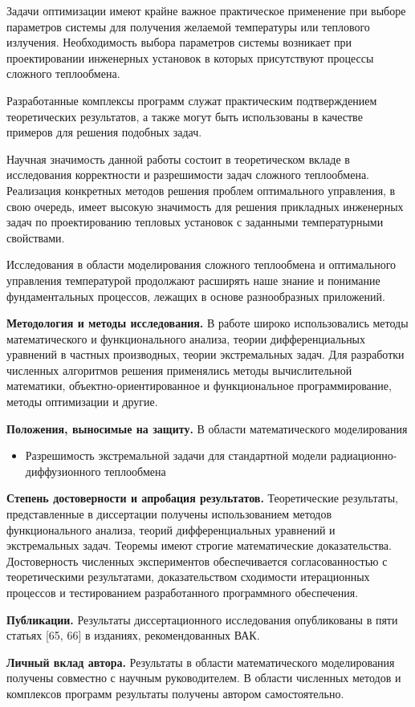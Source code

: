 Задачи оптимизации имеют крайне важное практическое применение при выборе параметров системы для
получения желаемой температуры или теплового излучения.
Необходимость выбора параметров системы возникает при проектировании инженерных установок
в которых присутствуют процессы сложного теплообмена.

Разработанные комплексы программ служат практическим подтверждением теоретических результатов,
а также могут быть использованы в качестве примеров для решения подобных задач.


Научная значимость данной работы состоит в теоретическом вкладе
в исследования корректности и разрешимости задач сложного теплообмена.
Реализация конкретных методов решения проблем оптимального управления,
в свою очередь, имеет высокую
значимость для решения прикладных инженерных задач по проектированию
тепловых установок с заданными температурными свойствами.


Исследования в области моделирования сложного теплообмена и оптимального управления
температурой продолжают расширять наше знание и понимание фундаментальных процессов,
лежащих в основе разнообразных приложений.

\textbf{Методология и методы исследования.}
В работе широко использовались методы математического и
функционального анализа, теории дифференциальных
уравнений в частных производных, теории экстремальных задач.
Для разработки численных алгоритмов решения
применялись методы вычислительной математики,
объектно-ориентированное и функциональное программирование,
методы оптимизации и другие.


\textbf{Положения, выносимые на защиту.}
В области математического моделирования
\begin{itemize}
    \item Разрешимость экстремальной задачи для стандартной модели радиационно-диффузионного теплообмена
\end{itemize}


\textbf{Степень достоверности и апробация результатов.}
Теоретические результаты, представленные в диссертации получены
использованием методов функционального анализа, теорий
дифференциальных уравнений и экстремальных задач.
Теоремы имеют строгие математические доказательства.
Достоверность численных экспериментов обеспечивается согласованностью
с теоретическими результатами, доказательством
сходимости итерационных процессов и тестированием разработанного программного обеспечения.

\textbf{Публикации.}
Результаты диссертационного исследования опубликованы в пяти статьях [65, 66] в изданиях, рекомендованных ВАК.


\textbf{Личный вклад автора.}
Результаты в области математического моделирования получены совместно с научным руководителем.
В области численных методов и комплексов программ результаты получены автором самостоятельно.
